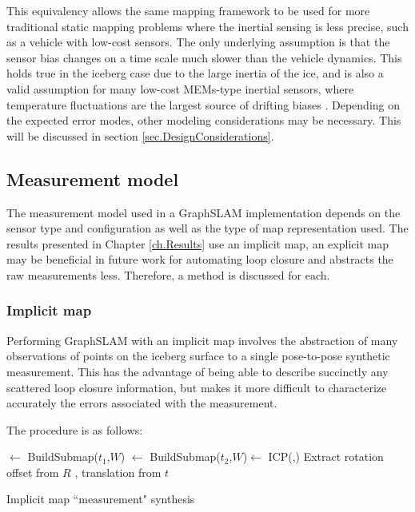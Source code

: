 This equivalency allows the same mapping framework to be used for more traditional static mapping problems where the inertial sensing is less precise, such as a vehicle with low-cost sensors. The only underlying assumption is that the sensor bias changes on a time scale much slower than the vehicle dynamics. This holds true in the iceberg case due to the large inertia of the ice, and is also a valid assumption for many low-cost MEMs-type inertial sensors, where temperature fluctuations are the largest source of drifting biases \cite{citationneeded}. Depending on the expected error modes, other modeling considerations may be necessary. This will be discussed in section \ref{sec.DesignConsiderations}.

\subsection{Measurement model}

The measurement model used in a GraphSLAM implementation depends on the sensor type and configuration as well as the type of map representation used. The results presented in Chapter \ref{ch.Results} use an implicit map, an explicit map may be beneficial in future work for automating loop closure and abstracts the raw measurements less. Therefore, a method is discussed for each.

\subsubsection{Implicit map}

Performing GraphSLAM with an implicit map involves the abstraction of many observations of points on the iceberg surface to a single pose-to-pose synthetic measurement. This has the advantage of being able to describe succinctly any scattered loop closure information, but makes it more difficult to characterize accurately the errors associated with the measurement. 

The procedure is as follows: 


\begin{algorithm}
\DontPrintSemicolon
\SetAlgoLined
{}
\MapOne $\leftarrow$ BuildSubmap($t_1$,$W$) \;
\MapTwo $\leftarrow$ BuildSubmap($t_2$,$W$)\;
[$R$, $t$] $\leftarrow$ ICP(\MapOne,\MapTwo)  \;
Extract rotation offset from $R$ , translation from $t$\;
 \caption{Implicit map ``measurement" synthesis}
\end{algorithm} 


